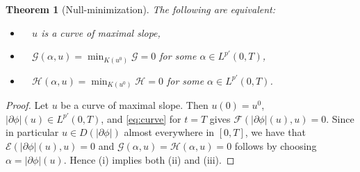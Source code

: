 \documentclass[reqno]{amsart}
\renewcommand{\sl}{|\partial \phi|}
\newcommand{\GG}{{\mathcal G}}
\newcommand{\EE}{{\mathcal E}}
\newcommand{\FF}{{\mathcal F}}
\newcommand{\HH}{{\mathcal H}}
\newtheorem{theorem}{Theorem}[section]
\begin{document}
 \begin{theorem}[Null-minimization]\label{prop:BEN}
    The following are equivalent:
   \begin{itemize}
   \item[\rm (i)] \ \  $u$ is a curve of maximal slope,\vspace{0.6mm}
     \item[\rm (ii)] \  \ $
  \GG(\alpha,u)=\min_{K(u^0)} \GG=0$ for some $\alpha \in
  L^{p'}(0,T)$,
  \item[\rm (iii)]  \ \   $
  \HH(\alpha,u)=\min_{K(u^0)} \HH=0$ for some $\alpha \in
  L^{p'}(0,T)$.
   \end{itemize}  
\end{theorem}
\begin{proof}
  Let $u$ be a curve of maximal slope. Then $u(0)=u^0$, $\sl (u) \in
  L^{p'}(0,T)$, and \eqref{eq:curve} for
  $t=T$ gives $\FF(\sl(u),u)=0$. Since in particular $u \in D(\sl) $
  almost everywhere in $[0,T]$, we have that $\EE(\sl(u),u)=0$ and $
  \GG(\alpha,u)  = \HH (\alpha,u)  =0$ follows by choosing
  $\alpha = \sl(u)$.  Hence (i) implies both (ii) and (iii). 


\end{proof}
\end{document}
